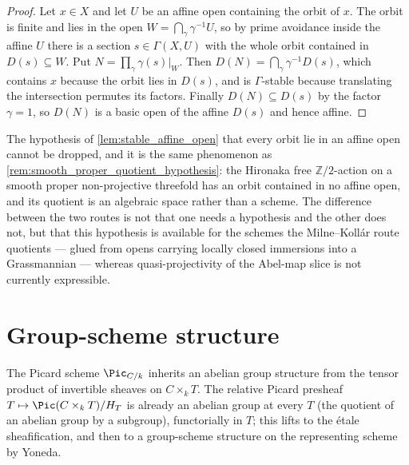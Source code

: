 \begin{proof}\leanok
  Let \(x \in X\) and let \(U\) be an affine open containing the orbit of \(x\).
  The orbit is finite and lies in the open
  \(W = \bigcap_{\gamma} \gamma^{-1} U\), so by prime avoidance inside the affine
  \(U\) there is a section \(s \in \Gamma(X, U)\) with the whole orbit contained
  in \(D(s) \subseteq W\). Put \(N = \prod_{\gamma} \gamma(s)|_W\). Then
  \(D(N) = \bigcap_{\gamma} \gamma^{-1} D(s)\), which contains \(x\) because the
  orbit lies in \(D(s)\), and is \(\Gamma\)-stable because translating the
  intersection permutes its factors. Finally \(D(N) \subseteq D(s)\) by the
  factor \(\gamma = 1\), so \(D(N)\) is a basic open of the affine \(D(s)\) and
  hence affine.
\end{proof}

\begin{remark}
  \label{rem:orbit_in_affine_hypothesis}
  The hypothesis of \cref{lem:stable_affine_open} that every orbit lie in an
  affine open cannot be dropped, and it is the same phenomenon as
  \cref{rem:smooth_proper_quotient_hypothesis}: the Hironaka free
  \(\mathbb{Z}/2\)-action on a smooth proper non-projective threefold has an
  orbit contained in no affine open, and its quotient is an algebraic space
  rather than a scheme. The difference between the two routes is not that one
  needs a hypothesis and the other does not, but that this hypothesis is
  available for the schemes the Milne--Koll\'ar route quotients --- glued from
  opens carrying locally closed immersions into a Grassmannian --- whereas
  quasi-projectivity of the Abel-map slice is not currently expressible.
\end{remark}

\section{Group-scheme structure}
\label{sec:fga_pic_group_structure}

The Picard scheme \(\Pic_{C/k}\) inherits an abelian group structure from
the tensor product of invertible sheaves on \(C \times_k T\). The relative
Picard presheaf \(T \mapsto \Pic(C \times_k T)/H_T\) is already an abelian
group at every \(T\) (the quotient of an abelian group by a subgroup),
functorially in \(T\); this lifts to the \'etale sheafification, and then
to a group-scheme structure on the representing scheme by Yoneda.

